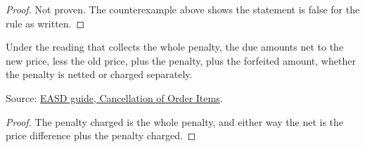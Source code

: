 \begin{proof}
  Not proven.  The counterexample above shows the statement is false for the
  rule as written.
\end{proof}

\begin{theorem}
  \label{thm:change-cancellation-net-of-collect}
  Under the reading that collects the whole penalty, the due amounts net to
  the new price, less the old price, plus the penalty, plus the forfeited
  amount, whether the penalty is netted or charged separately.

  Source: \href{https://standards.atlassian.net/wiki/spaces/EASD/pages/574783569/Cancellation+of+Order+Items}{EASD guide, Cancellation of Order Items}.
\end{theorem}
\begin{proof}
  The penalty charged is the whole penalty, and either way the net is the
  price difference plus the penalty charged.
\end{proof}

